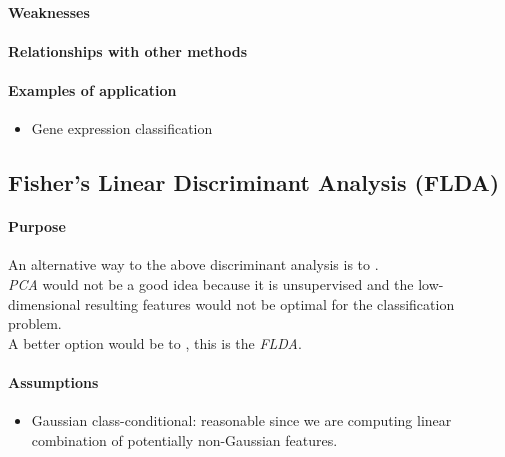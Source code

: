 \paragraph{Weaknesses}
\paragraph{Relationships with other methods}
\paragraph{Examples of application}
\begin{itemize}
    \item Gene expression classification
\end{itemize}

\subsection{Fisher's Linear Discriminant Analysis (FLDA)}
\paragraph{Purpose}
An alternative way to the above discriminant analysis is to .\\
\emph{PCA} would not be a good idea because it is unsupervised and the low-dimensional
resulting features would not be optimal for the classification problem.\\
A better option would be to , this is the \emph{FLDA}.
\paragraph{Assumptions}
\begin{itemize}
    \item Gaussian class-conditional: reasonable since we are computing linear 
        combination of potentially non-Gaussian features.
\end{itemize}

